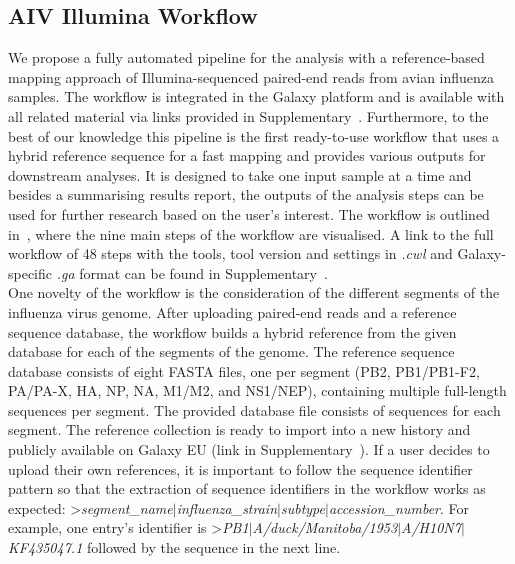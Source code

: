 \subsection{AIV Illumina Workflow}\label{sec:aiv-wf}
We propose a fully automated pipeline for the analysis with a reference-based mapping approach of Illumina-sequenced paired-end reads from avian influenza samples. The workflow is integrated in the Galaxy platform and is available with all related material via links provided in Supplementary~. Furthermore, to the best of our knowledge this pipeline is the first ready-to-use workflow that uses a hybrid reference sequence for a fast mapping and provides various outputs for downstream analyses. It is designed to take one input sample at a time and besides a summarising results report, the outputs of the analysis steps can be used for further research based on the user's interest.  The workflow is outlined in~, where the nine main steps of the workflow are visualised. A link to the full workflow of 48 steps with the tools, tool version and settings in \textit{.cwl} and Galaxy-specific \textit{.ga} format can be found in Supplementary~. \\
One novelty of the workflow is the consideration of the different segments of the influenza virus genome. After uploading paired-end reads and a reference sequence database, the workflow builds a hybrid reference from the given database for each of the segments of the genome. The reference sequence database consists of eight FASTA files, one per segment (PB2, PB1/PB1-F2, PA/PA-X, HA, NP, NA, M1/M2, and NS1/NEP), containing multiple full-length sequences per segment. The provided database file consists of  sequences for each segment. The reference collection is ready to import into a new history and publicly available on Galaxy EU (link in Supplementary~). If a user decides to upload their own references, it is important to follow the sequence identifier pattern so that the extraction of sequence identifiers in the workflow works as expected: >\textit{segment\_name$\mid$influenza\_strain$\mid$subtype$\mid$accession\_number}. For example, one entry's identifier is >\textit{PB1$\mid$A/duck/Manitoba/1953$\mid$A/H10N7$\mid$KF435047.1} followed by the sequence in the next line. 

